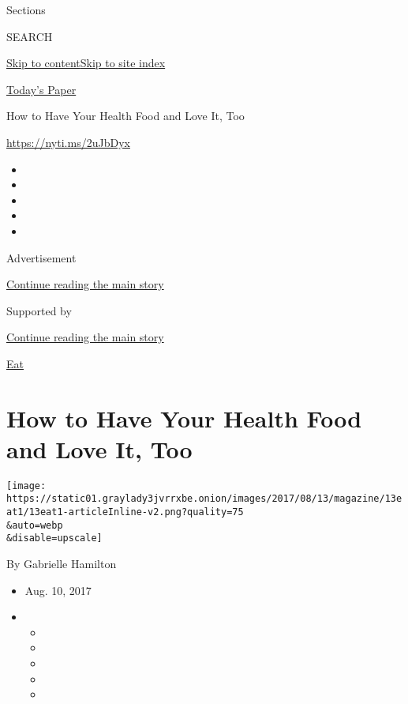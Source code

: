 Sections

SEARCH

\protect\hyperlink{site-content}{Skip to
content}\protect\hyperlink{site-index}{Skip to site index}

\href{https://myaccount.nytimes3xbfgragh.onion/auth/login?response_type=cookie\&client_id=vi}{}

\href{https://www.nytimes3xbfgragh.onion/section/todayspaper}{Today's
Paper}

How to Have Your Health Food and Love It, Too

\url{https://nyti.ms/2uJbDyx}

\begin{itemize}
\item
\item
\item
\item
\item
\end{itemize}

Advertisement

\protect\hyperlink{after-top}{Continue reading the main story}

Supported by

\protect\hyperlink{after-sponsor}{Continue reading the main story}

\href{/column/magazine-eat}{Eat}

\hypertarget{how-to-have-your-health-food-and-love-it-too}{%
\section{How to Have Your Health Food and Love It,
Too}\label{how-to-have-your-health-food-and-love-it-too}}

\texttt{[image: https://static01.graylady3jvrrxbe.onion/images/2017/08/13/magazine/13eat1/13eat1-articleInline-v2.png?quality=75\\\&auto=webp\\\&disable=upscale]}

By Gabrielle Hamilton

\begin{itemize}
\item
  Aug. 10, 2017
\item
  \begin{itemize}
  \item
  \item
  \item
  \item
  \item
  \end{itemize}
\end{itemize}

